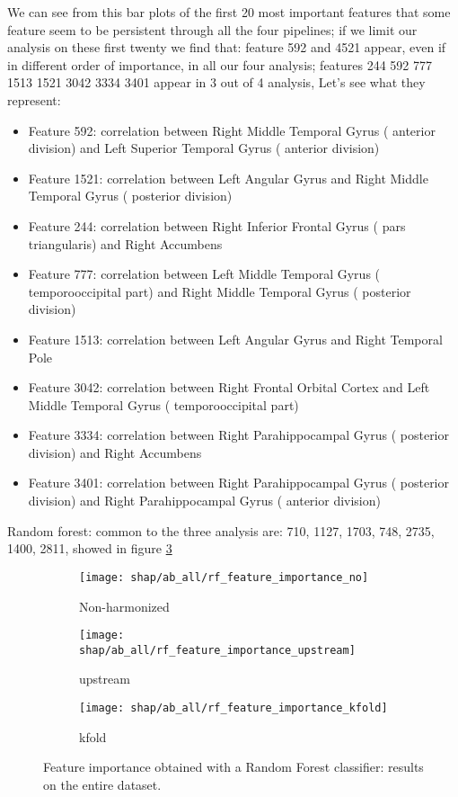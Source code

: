 \documentclass[a4paper,11pt]{article}
\begin{document}
We can see from this bar plots of the first 20 most important features that some feature seem to be persistent through all the four pipelines; if we limit our analysis on these first twenty we find that: feature 592 and 4521 appear, even if in different order of importance, in all our four analysis; features 244 592 777 1513 1521 3042 3334 3401 appear in 3 out of 4 analysis,
Let's see what they represent:
\begin{itemize}
\item Feature 592: correlation between Right Middle Temporal Gyrus ( anterior division) and Left Superior Temporal Gyrus ( anterior division)
\item Feature 1521: correlation between Left Angular Gyrus  and Right Middle Temporal Gyrus ( posterior division)

\item Feature 244: correlation between Right Inferior Frontal Gyrus ( pars triangularis) and Right Accumbens
\item Feature 777: correlation between Left Middle Temporal Gyrus ( temporooccipital part) and Right Middle Temporal Gyrus ( posterior division)
\item Feature 1513: correlation between Left Angular Gyrus  and Right Temporal Pole
\item Feature 3042: correlation between Right Frontal Orbital Cortex  and Left Middle Temporal Gyrus ( temporooccipital part)
\item Feature 3334: correlation between Right Parahippocampal Gyrus ( posterior division) and Right Accumbens
\item Feature 3401: correlation between Right Parahippocampal Gyrus ( posterior division) and Right Parahippocampal Gyrus ( anterior division)
\end{itemize}


Random forest: common to the three analysis are: 710, 1127, 1703, 748, 2735, 1400, 2811, showed in figure \ref{}


\begin{figure}
\centering
\begin{subfigure}[b]{.45\textwidth}
   \texttt{[image: shap/ab\_all/rf\_feature\_importance\_no]}
   \caption{Non-harmonized}
   \label{}
\end{subfigure}
\begin{subfigure}[b]{.45\textwidth}
   \texttt{[image: shap/ab\_all/rf\_feature\_importance\_upstream]}
   \caption{upstream}
   \label{}
\end{subfigure}
\begin{subfigure}[b]{.45\textwidth}
   \texttt{[image: shap/ab\_all/rf\_feature\_importance\_kfold]}
   \caption{kfold}
   \label{}
\end{subfigure}
\caption{Feature importance obtained with a Random Forest classifier: results on the entire dataset.}
\label{fig:shap_ab1}
\end{figure}
\end{document}
